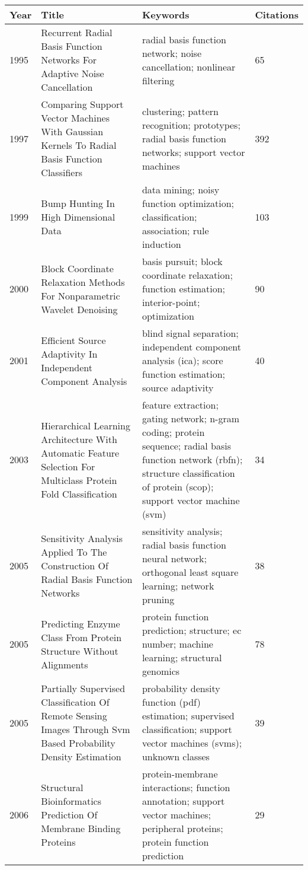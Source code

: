 
\begin{table}[ht]
\centering
\begingroup\tiny
\begin{tabular}{p{}p{}p{}p{}}
  \hline
Year & Title & Keywords & Citations \\ 
  \hline
1995 & Recurrent Radial Basis Function Networks For Adaptive Noise Cancellation & radial basis function network; noise cancellation; nonlinear filtering &  65 \\ 
  1997 & Comparing Support Vector Machines With Gaussian Kernels To Radial Basis Function Classifiers & clustering; pattern recognition; prototypes; radial basis function networks; support vector machines & 392 \\ 
  1999 & Bump Hunting In High Dimensional Data & data mining; noisy function optimization; classification; association; rule induction & 103 \\ 
  2000 & Block Coordinate Relaxation Methods For Nonparametric Wavelet Denoising & basis pursuit; block coordinate relaxation; function estimation; interior-point; optimization &  90 \\ 
  2001 & Efficient Source Adaptivity In Independent Component Analysis & blind signal separation; independent component analysis (ica); score function estimation; source adaptivity &  40 \\ 
  2003 & Hierarchical Learning Architecture With Automatic Feature Selection For Multiclass Protein Fold Classification & feature extraction; gating network; n-gram coding; protein sequence; radial basis function network (rbfn); structure classification of protein (scop); support vector machine (svm) &  34 \\ 
  2005 & Sensitivity Analysis Applied To The Construction Of Radial Basis Function Networks & sensitivity analysis; radial basis function neural network; orthogonal least square learning; network pruning &  38 \\ 
  2005 & Predicting Enzyme Class From Protein Structure Without Alignments & protein function prediction; structure; ec number; machine learning; structural genomics &  78 \\ 
  2005 & Partially Supervised Classification Of Remote Sensing Images Through Svm Based Probability Density Estimation & probability density function (pdf) estimation; supervised classification; support vector machines (svms); unknown classes &  39 \\ 
  2006 & Structural Bioinformatics Prediction Of Membrane Binding Proteins & protein-membrane interactions; function annotation; support vector machines; peripheral proteins; protein function prediction &  29 \\ 

\end{tabular}
\end{table}
